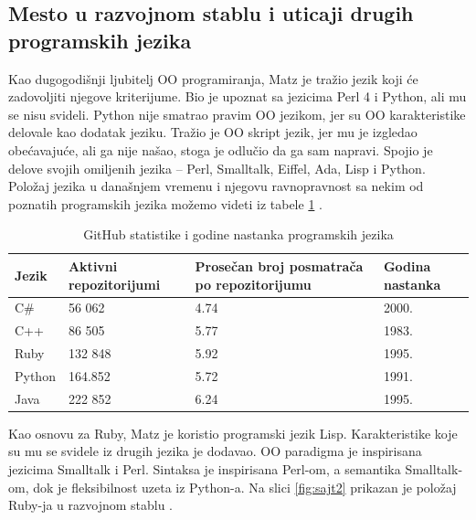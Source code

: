 \documentclass[a4paper]{article}
\begin{document}
\subsection{Mesto u razvojnom stablu i uticaji drugih programskih jezika}

Kao dugogodišnji ljubitelj OO programiranja, Matz je tražio jezik koji će zadovoljiti njegove kriterijume. Bio je upoznat sa jezicima Perl 4 i Python, ali mu se nisu svideli. Python nije smatrao pravim OO jezikom, jer su OO karakteristike delovale kao dodatak jeziku. Tražio je OO skript jezik, jer mu je izgledao obećavajuće, ali ga nije našao, stoga je odlučio da ga sam napravi. Spojio je delove svojih omiljenih jezika – Perl, Smalltalk, Eiffel, Ada, Lisp i Python. Položaj jezika u današnjem vremenu i njegovu ravnopravnost sa nekim od poznatih programskih jezika možemo videti iz tabele \ref{tab:tabela1} \cite{rubyProgLang}.

\begin{table}[h!]
\begin{center}
\caption{GitHub statistike i godine nastanka programskih jezika}\vspace*{15pt}
\begin{tabular}{|p{1cm}|p{2cm}|p{4cm}|p{2cm}|} \hline
Jezik&Aktivni repozitorijumi&Prosečan broj posmatrača po repozitorijumu& Godina nastanka\\ \hline
C\#&56 062 &4.74&2000.\\ \hline
C++&86 505 &5.77&1983.\\ \hline
Ruby&132 848 &5.92&1995.\\ \hline
Python&164.852 &5.72&1991.\\ \hline
Java&222 852 &6.24&1995.\\ \hline
\end{tabular}
\label{tab:tabela1}
\end{center}
\end{table}
Kao osnovu za Ruby, Matz je koristio programski jezik Lisp. Karakteristike koje su mu se svidele iz drugih jezika je dodavao. OO paradigma je inspirisana jezicima Smalltalk i Perl. Sintaksa je inspirisana Perl-om, a semantika Smalltalk-om, dok je fleksibilnost uzeta iz Python-a. Na slici \ref{fig:sajt2} prikazan je položaj Ruby-ja u razvojnom stablu \cite{rubyTalk}\cite{ruby-doc}.
\end{document}
